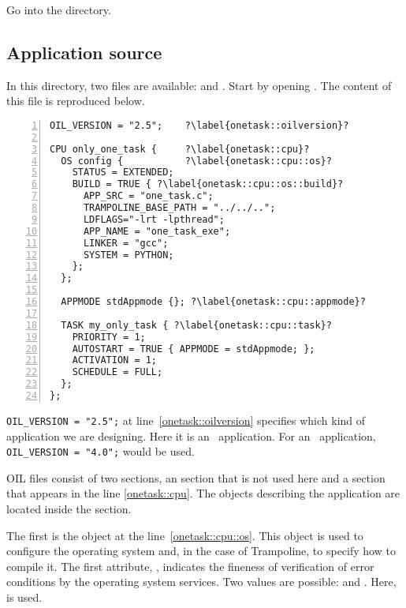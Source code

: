 Go into the  directory.

\subsection{Application source}

In this directory, two files are available:  and . Start by opening . The content of this file is reproduced below. 

\begin{lstlisting}[language=OIL,numbers=left,escapechar=?]
OIL_VERSION = "2.5"; 	?\label{onetask::oilversion}?

CPU only_one_task {  	?\label{onetask::cpu}?
  OS config {			?\label{onetask::cpu::os}?
    STATUS = EXTENDED;
    BUILD = TRUE { ?\label{onetask::cpu::os::build}?
      APP_SRC = "one_task.c";
      TRAMPOLINE_BASE_PATH = "../../..";
      LDFLAGS="-lrt -lpthread";
      APP_NAME = "one_task_exe";
      LINKER = "gcc";
      SYSTEM = PYTHON;
    };
  };
  
  APPMODE stdAppmode {}; ?\label{onetask::cpu::appmode}?
  
  TASK my_only_task { ?\label{onetask::cpu::task}?
    PRIORITY = 1;
    AUTOSTART = TRUE { APPMODE = stdAppmode; };
    ACTIVATION = 1;
    SCHEDULE = FULL;
  };
};
\end{lstlisting}

\lstinline[language=OIL]{OIL_VERSION = "2.5";} at line~\ref{onetask::oilversion} specifies which kind of application we are designing. Here it is an \osek\ application. For an \autosar\ application, \lstinline[language=OIL]{OIL_VERSION = "4.0";} would be used.

OIL files consist of two sections, an  section that is not used here and a  section that appears in the line \ref{onetask::cpu}. The objects describing the application are located inside the  section.

The first is the  object at the line~\ref{onetask::cpu::os}. This object is used to configure the operating system and, in the case of Trampoline, to specify how to compile it. The first attribute, , indicates the fineness of verification of error conditions by the operating system services. Two values are possible:  and . Here,  is used.

